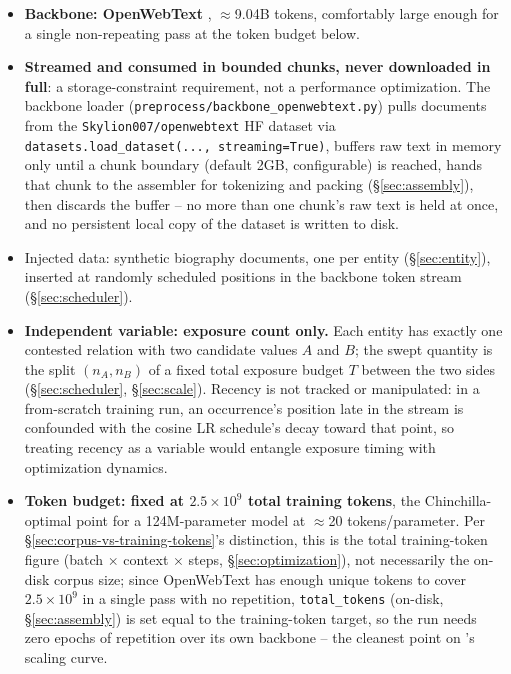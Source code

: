 \documentclass[11pt]{article}
\begin{document}
\begin{itemize}
  \item \textbf{Backbone: OpenWebText} \citep{Gokaslan2019OpenWebText},
    $\approx$9.04B tokens, comfortably large enough for a single non-repeating
    pass at the token budget below.
  \item \textbf{Streamed and consumed in bounded chunks, never downloaded in
    full}: a storage-constraint requirement, not a performance optimization.
    The backbone loader (\texttt{preprocess/backbone\_openwebtext.py}) pulls
    documents from the \texttt{Skylion007/openwebtext} HF dataset via
    \texttt{datasets.load\_dataset(..., streaming=True)}, buffers raw text in
    memory only until a chunk boundary (default 2GB, configurable) is reached,
    hands that chunk to the assembler for tokenizing and packing
    (\S\ref{sec:assembly}), then discards the buffer -- no more than one
    chunk's raw text is held at once, and no persistent local copy of the
    dataset is written to disk.
  \item Injected data: synthetic biography documents, one per entity
    (\S\ref{sec:entity}), inserted at randomly scheduled positions in the
    backbone token stream (\S\ref{sec:scheduler}).
  \item \textbf{Independent variable: exposure count only.} Each entity has
    exactly one contested relation with two candidate values $A$ and $B$; the
    swept quantity is the split $(n_A, n_B)$ of a fixed total exposure budget
    $T$ between the two sides (\S\ref{sec:scheduler}, \S\ref{sec:scale}).
    Recency is not tracked or manipulated: in a from-scratch training run, an
    occurrence's position late in the stream is confounded with the cosine LR
    schedule's decay toward that point, so treating recency as a variable
    would entangle exposure timing with optimization dynamics.
  \item \textbf{Token budget: fixed at $2.5\times10^9$ total training tokens},
    the Chinchilla-optimal point for a 124M-parameter model
    \citep{hoffmann2022chinchilla} at $\approx$20 tokens/parameter. Per
    \S\ref{sec:corpus-vs-training-tokens}'s distinction, this is the total
    training-token figure (batch $\times$ context $\times$ steps,
    \S\ref{sec:optimization}), not necessarily the on-disk corpus size; since
    OpenWebText has enough unique tokens to cover $2.5\times10^9$ in a single
    pass with no repetition, \texttt{total\_tokens} (on-disk, \S\ref{sec:assembly})
    is set equal to the training-token target, so the run needs zero epochs
    of repetition over its own backbone -- the cleanest point on
    \citet{muennighoff2023scaling}'s scaling curve.
\end{itemize}
\end{document}
